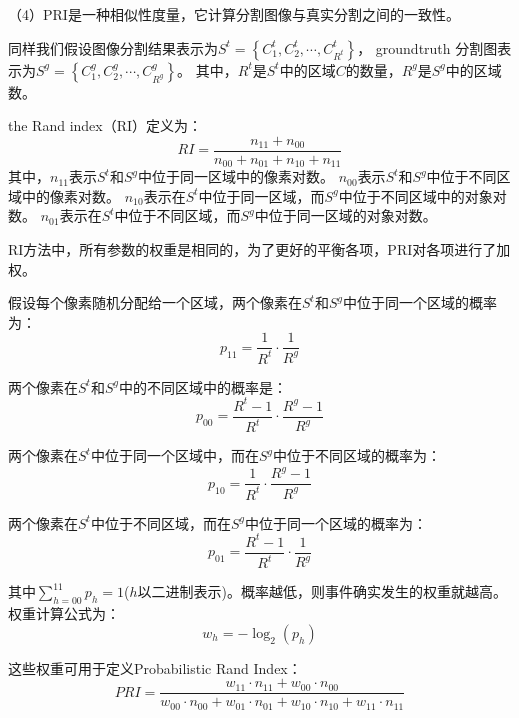 （4）PRI是一种相似性度量，它计算分割图像与真实分割之间的一致性。

同样我们假设图像分割结果表示为$S^{t} = \left \{ C_{1}^{t},C_{2}^{t},\cdots ,C_{R^{t}}^{t} \right \}$，
groundtruth 分割图表示为$S^{g} = \left \{ C_{1}^{g},C_{2}^{g},\cdots ,C_{R^{g}}^{g} \right \}$。
其中，$R^{t}$是$S^{t}$中的区域$C$的数量，$R^{g}$是$S^{g}$中的区域数。

the Rand index（RI）定义为：
\begin{equation}
RI = \frac{n_{11}+n_{00}}{n_{00}+n_{01}+n_{10}+n_{11}}
\end{equation}
其中，$n_{11}$表示$S^{t}$和$S^{g}$中位于同一区域中的像素对数。
$n_{00}$表示$S^{t}$和$S^{g}$中位于不同区域中的像素对数。
$n_{10}$表示在$S^{t}$中位于同一区域，而$S^{g}$中位于不同区域中的对象对数。
$n_{01}$表示在$S^{t}$中位于不同区域，而$S^{g}$中位于同一区域的对象对数。

RI方法中，所有参数的权重是相同的，为了更好的平衡各项，PRI对各项进行了加权。

假设每个像素随机分配给一个区域，两个像素在$S^{t}$和$S^{g}$中位于同一个区域的概率为：
\begin{equation}
p_{11}=\frac{1}{R^t} \cdot \frac{1}{R^g}
\end{equation}

两个像素在$S^{t}$和$S^{g}$中的不同区域中的概率是：
\begin{equation}
p_{00}=\frac{R^t-1}{R^t} \cdot \frac{R^g-1}{R^g}
\end{equation}

两个像素在$S^{t}$中位于同一个区域中，而在$S^{g}$中位于不同区域的概率为：
\begin{equation}
p_{10}=\frac{1}{R^t} \cdot \frac{R^g-1}{R^g}
\end{equation}

两个像素在$S^{t}$中位于不同区域，而在$S^{g}$中位于同一个区域的概率为：
\begin{equation}
p_{01}=\frac{R^t-1}{R^t} \cdot \frac{1}{R^g}
\end{equation}

其中$\sum_{h=00}^{11}p_{h}=1$($h$以二进制表示)。概率越低，则事件确实发生的权重就越高。权重计算公式为：
\begin{equation}
w_{h} = -\log_2\left ( p_{h}\right )
\end{equation}

这些权重可用于定义Probabilistic Rand Index：
\begin{equation}
PRI = \frac{w_{11}\cdot n_{11}+w_{00}\cdot n_{00}}
{w_{00}\cdot n_{00}+w_{01}\cdot n_{01}+w_{10}\cdot n_{10}+w_{11}\cdot n_{11}}
\end{equation}

